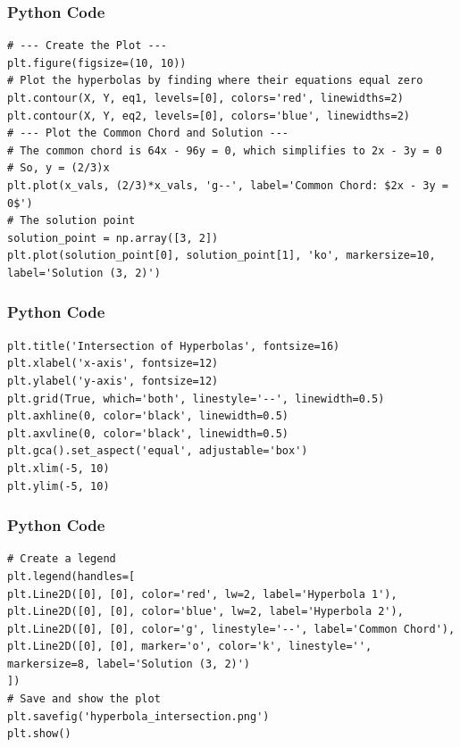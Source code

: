 \documentclass{beamer}
\begin{document}
\begin{frame}[fragile]
	\frametitle{Python Code}
	\begin{lstlisting}
# --- Create the Plot ---
plt.figure(figsize=(10, 10))
# Plot the hyperbolas by finding where their equations equal zero
plt.contour(X, Y, eq1, levels=[0], colors='red', linewidths=2)
plt.contour(X, Y, eq2, levels=[0], colors='blue', linewidths=2)
# --- Plot the Common Chord and Solution ---
# The common chord is 64x - 96y = 0, which simplifies to 2x - 3y = 0
# So, y = (2/3)x
plt.plot(x_vals, (2/3)*x_vals, 'g--', label='Common Chord: $2x - 3y = 0$')
# The solution point
solution_point = np.array([3, 2])
plt.plot(solution_point[0], solution_point[1], 'ko', markersize=10, label='Solution (3, 2)')
	\end{lstlisting}
	
\end{frame}
\begin{frame}[fragile]
	\frametitle{Python Code}
	\begin{lstlisting}
plt.title('Intersection of Hyperbolas', fontsize=16)
plt.xlabel('x-axis', fontsize=12)
plt.ylabel('y-axis', fontsize=12)
plt.grid(True, which='both', linestyle='--', linewidth=0.5)
plt.axhline(0, color='black', linewidth=0.5)
plt.axvline(0, color='black', linewidth=0.5)
plt.gca().set_aspect('equal', adjustable='box')
plt.xlim(-5, 10)
plt.ylim(-5, 10)
	\end{lstlisting}
	
\end{frame}
\begin{frame}[fragile]
	\frametitle{Python Code}
	\begin{lstlisting}
# Create a legend
plt.legend(handles=[
plt.Line2D([0], [0], color='red', lw=2, label='Hyperbola 1'),
plt.Line2D([0], [0], color='blue', lw=2, label='Hyperbola 2'),
plt.Line2D([0], [0], color='g', linestyle='--', label='Common Chord'),
plt.Line2D([0], [0], marker='o', color='k', linestyle='', markersize=8, label='Solution (3, 2)')
])
# Save and show the plot
plt.savefig('hyperbola_intersection.png')
plt.show()
	\end{lstlisting}
	
\end{frame}
\end{document}
